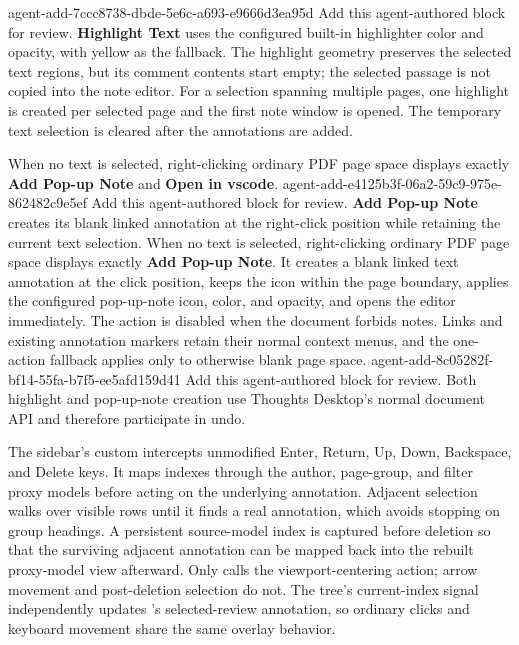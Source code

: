 \agentProposedEdit
  {agent-add-7ccc8738-dbde-5e6c-a693-e9666d3ea95d}
  {Add this agent-authored block for review.}
  {}
  {\textbf{Highlight Text} uses the configured built-in highlighter color and opacity, with yellow as the fallback.}
The highlight geometry preserves the selected text regions, but its comment contents start empty; the selected passage is not copied into the note editor.
For a selection spanning multiple pages, one highlight is created per selected page and the first note window is opened.
The temporary text selection is cleared after the annotations are added.

When no text is selected, right-clicking ordinary PDF page space displays exactly \textbf{Add Pop-up Note} and \textbf{Open in vscode}.
\agentProposedEdit
  {agent-add-e4125b3f-06a2-59c9-975e-862482c9e5ef}
  {Add this agent-authored block for review.}
  {}
  {\textbf{Add Pop-up Note} creates its blank linked annotation at the right-click position while retaining the current text selection.
When no text is selected, right-clicking ordinary PDF page space displays exactly \textbf{Add Pop-up Note}.
It creates a blank linked text annotation at the click position, keeps the icon within the page boundary, applies the configured pop-up-note icon, color, and opacity, and opens the editor immediately.
The action is disabled when the document forbids notes.
Links and existing annotation markers retain their normal context menus, and the one-action fallback applies only to otherwise blank page space.}
\agentProposedEdit
  {agent-add-8c05282f-bf14-55fa-b7f5-ee5afd159d41}
  {Add this agent-authored block for review.}
  {}
  {Both highlight and pop-up-note creation use Thoughts Desktop's normal document API and therefore participate in undo.}

The sidebar's custom  intercepts unmodified Enter, Return, Up, Down, Backspace, and Delete keys.
It maps indexes through the author, page-group, and filter proxy models before acting on the underlying annotation.
Adjacent selection walks over visible rows until it finds a real annotation, which avoids stopping on group headings.
A persistent source-model index is captured before deletion so that the surviving adjacent annotation can be mapped back into the rebuilt proxy-model view afterward.
Only  calls the viewport-centering action; arrow movement and post-deletion selection do not.
The tree's current-index signal independently updates 's selected-review annotation, so ordinary clicks and keyboard movement share the same overlay behavior.

